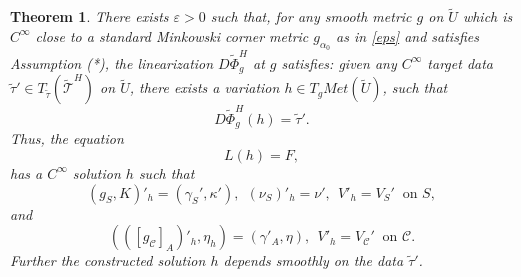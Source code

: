 \documentclass[10pt]{amsart}
\renewcommand{\a}{\alpha}
\newcommand{\g}{\gamma}
\newcommand{\e}{\varepsilon}
\renewcommand{\k}{\kappa}
\newcommand{\cC}{{\mathcal C}}
\newcommand{\cT}{{\mathcal T}}
\newcommand{\be}{\begin{equation}}
\newcommand{\ee}{\end{equation}}
\newcommand{\<}{\langle}
\renewcommand{\>}{\rangle}
\newcommand{\w}{\widetilde}
\theoremstyle{plain}
\newtheorem{theorem}[lemma]{Theorem}
\theoremstyle{remark}
\theoremstyle{definition}
\numberwithin{equation}{section}
\begin{document}
\begin{theorem}\label{modexist}
There exists $\e > 0$ such that, for any smooth metric $g$ on $\w U$ which is $C^{\infty}$ close to a standard Minkowski corner metric $g_{\a_0}$ 
as in \eqref{eps} and satisfies Assumption (*), the linearization $D\w \Phi_g^H$ at $g$ satisfies: given any $C^{\infty}$ target data 
$\w \tau' \in T_{\w \tau}(\w \cT^H)$ on $\w U$, there exists a variation $h \in T_g Met(\w U)$, such that 
\be \label{DwPhisol}
D\w \Phi_g^H(h) = \w \tau'.
\ee
Thus, the equation 
\be \label{LhF}
L(h) = F,
\ee
has a $C^{\infty}$ solution $h$ such that 
\be \label{IC1}
(g_S, K)'_h = (\g_S', \k'), \ \ (\nu_S)'_h = \nu', \ \ V'_h = V_S' \ \mbox{ on }S,
\ee
and
\be \label{BC1}
(([g_\cC]_A)'_h, \eta_h) = (\g'_A, \eta), \ \ V'_h = V_\cC' \ \mbox{ on }\cC.
\ee
Further the constructed solution $h$ depends smoothly on the data $\w \tau'$. 
\end{theorem}
  
\end{document}
